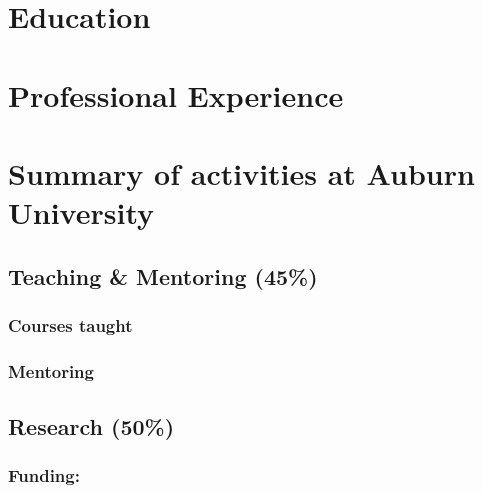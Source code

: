

\newcommand{\longcontent}[1]{#1}

\newcommand{\oldcontent}[1]{}

\newcommand{\docTitle}{Curriculum Vitae\xspace}


\thispagestyle{empty}
\singlespacing



\section{Education}


\section{Professional Experience}


\section{Summary of activities at Auburn University}

\subsection{Teaching \& Mentoring (45\%)}

\subsubsection{Courses taught}


\subsubsection{Mentoring}


\subsection{Research (50\%)}

\subsubsection{Funding:}


